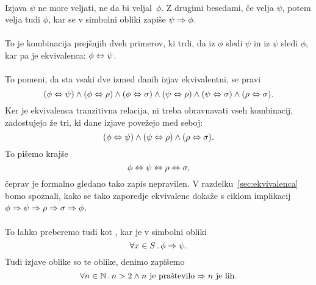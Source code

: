 \paragraph{}
%
Izjava $\psi$ ne more veljati, ne da bi veljal~$\phi$. Z drugimi
besedami, če velja $\psi$, potem velja tudi $\phi$, kar se v simbolni obliki
zapiše $\psi \Rightarrow \phi$.

\paragraph{}
%
To je kombinacija prejšnjih dveh primerov, ki trdi, da iz $\phi$ sledi
$\psi$ in iz $\psi$ sledi $\phi$, kar pa je ekvivalenca:
%
$\phi \Leftrightarrow \psi$.

\paragraph{}
%
To pomeni, da sta vsaki dve izmed danih izjav ekvivalentni, se pravi
%
\begin{equation*}
  (\phi \Leftrightarrow \psi) \land (\phi \Leftrightarrow \rho) \land (\phi \Leftrightarrow \sigma) \land (\psi \Leftrightarrow \rho)
  \land (\psi \Leftrightarrow \sigma) \land (\rho \Leftrightarrow \sigma).
\end{equation*}
%
Ker je ekvivalenca tranzitivna relacija, ni treba obravnavati vseh
kombinacij, zadostujejo že tri, ki dane izjave povežejo med seboj:
%
\begin{equation*}
  (\phi \Leftrightarrow \psi) \land (\psi \Leftrightarrow \rho) \land (\rho \Leftrightarrow \sigma).
\end{equation*}
%
To pišemo krajše
%
\begin{equation*}
  \phi \Leftrightarrow \psi \Leftrightarrow \rho \Leftrightarrow \sigma,
\end{equation*}
%
čeprav je formalno gledano tako zapis nepravilen. V
razdelku~\ref{sec:ekvivalenca} bomo spoznali, kako se tako zaporedje
ekvivalenc dokaže s ciklom implikacij $\phi \Rightarrow \psi \Rightarrow \rho
\Rightarrow \sigma \Rightarrow \phi$.

\paragraph{}
%
To lahko preberemo tudi kot , kar je v simbolni obliki
%
\begin{equation*}
  \forall x \in S \,.\, \phi \Rightarrow \psi.
\end{equation*}
%
Tudi izjave oblike  so te oblike, denimo  zapišemo
%
\begin{equation*}
  \forall n \in \mathbb{N} \,.\, n > 2 \land \text{$n$ je praštevilo} \Rightarrow \text{$n$ je lih}.
\end{equation*}

